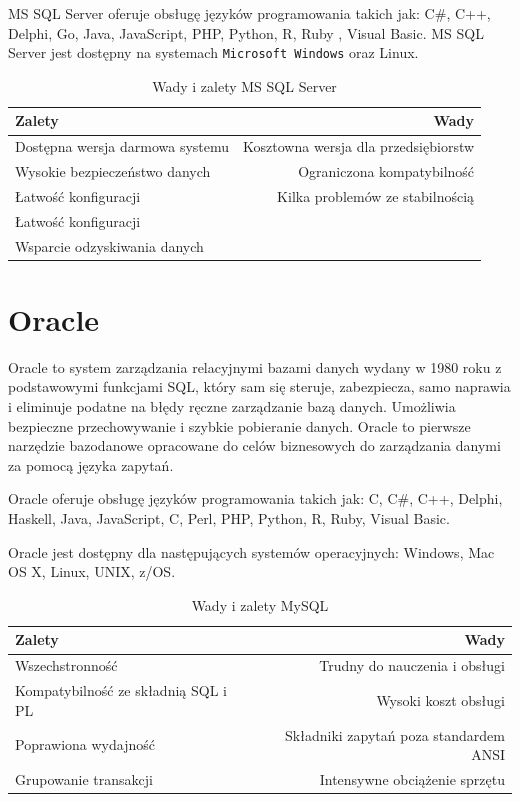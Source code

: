 \documentclass[oneside,polski,logo,indent]{amuthesis}
\begin{document}
MS SQL Server oferuje obsługę języków programowania takich jak: C\#, C++, Delphi, Go, Java, JavaScript, PHP, Python, R, Ruby , Visual Basic.
MS SQL Server jest dostępny na systemach \texttt{Microsoft Windows} oraz Linux.

\begin{table}[H]
\caption{Wady i zalety MS SQL Server}
\label{tabela-MS SQL Server}
\centering
\begin{adjustbox}{width=1\textwidth}
\small
\begin{tabular}{lr}
\toprule
Zalety & Wady\\
\midrule
Dostępna wersja darmowa systemu & Kosztowna wersja dla przedsiębiorstw\\
Wysokie bezpieczeństwo danych & Ograniczona kompatybilność\\
Łatwość konfiguracji & Kilka problemów ze stabilnością\\
Łatwość konfiguracji & \\
Wsparcie odzyskiwania danych & \\
\bottomrule
\end{tabular}
\end{adjustbox}
\end{table}
\section{Oracle}
Oracle to system zarządzania relacyjnymi bazami danych wydany w 1980 roku z podstawowymi funkcjami SQL, który sam się steruje, zabezpiecza, samo naprawia i eliminuje podatne na błędy ręczne zarządzanie bazą danych. Umożliwia bezpieczne przechowywanie i szybkie pobieranie danych. Oracle to pierwsze narzędzie bazodanowe opracowane do celów biznesowych do zarządzania danymi za pomocą języka zapytań. 

Oracle oferuje obsługę języków programowania takich jak: C, C\#, C++, Delphi, Haskell, Java, JavaScript, C, Perl, PHP, Python, R, Ruby, Visual Basic.

Oracle jest dostępny dla następujących systemów operacyjnych: Windows, Mac OS X, Linux, UNIX, z/OS.
\begin{table}[H]
\caption{Wady i zalety MySQL}
\label{tabela-Oracle}
\centering
\begin{adjustbox}{width=1\textwidth}
\small
\begin{tabular}{lr}
\toprule
Zalety & Wady\\
\midrule
Wszechstronność & Trudny do nauczenia i obsługi\\
Kompatybilność ze składnią SQL i PL & Wysoki koszt obsługi\\
Poprawiona wydajność & Składniki zapytań poza standardem ANSI \\
Grupowanie transakcji & Intensywne obciążenie sprzętu\\
\bottomrule
\end{tabular}
\end{adjustbox}
\end{table}
\end{document}

